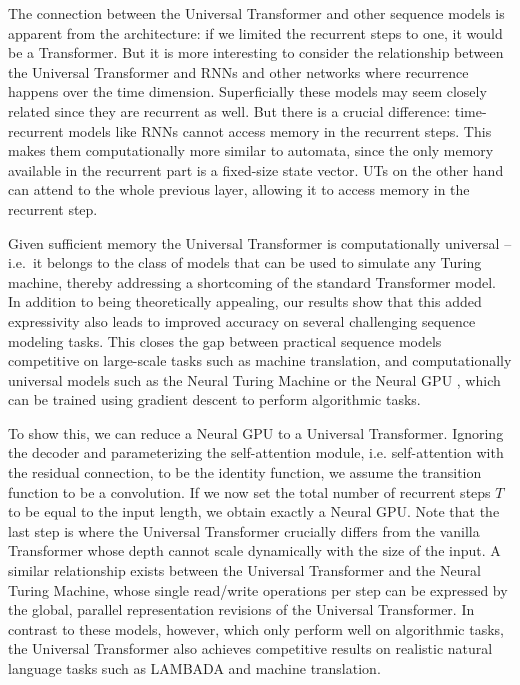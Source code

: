 The connection between the Universal Transformer and other sequence models is apparent from the architecture: if we limited the recurrent steps to one, it would be a Transformer. But it is more interesting to consider the relationship between the Universal Transformer and RNNs and other networks where recurrence happens over the time dimension. Superficially these models may seem closely related since they are recurrent as well. But there is a crucial difference: time-recurrent models like RNNs cannot access memory in the recurrent steps. This makes them computationally more similar to automata, since the only memory available in the recurrent part is a fixed-size state vector. UTs on the other hand can attend to the whole previous layer, allowing it to access memory in the recurrent step. 

Given sufficient memory the Universal Transformer is computationally universal -- i.e.\ it belongs to the class of models that can be used to simulate any Turing machine, thereby addressing a shortcoming of the standard Transformer model. In addition to being theoretically appealing, our results show that this added expressivity also leads to improved accuracy on several challenging sequence modeling tasks. This closes the gap between practical sequence models competitive on large-scale tasks such as machine translation, and computationally universal models such as the Neural Turing Machine or the Neural GPU \citep{ntm14,neural_gpu}, which can be trained using gradient descent to perform algorithmic tasks.

To show this, we can reduce a Neural GPU to a Universal Transformer. Ignoring the decoder and parameterizing the self-attention module, i.e. self-attention with the residual connection, to be the identity function, we assume the transition function to be a convolution. If we now set the total number of recurrent steps $T$ to be equal to the input length, we obtain exactly a Neural GPU. Note that the last step is where the Universal Transformer crucially differs from the vanilla Transformer whose depth cannot scale dynamically with the size of the input. A similar relationship exists between the Universal Transformer and the Neural Turing Machine, whose single read/write operations per step can be expressed by the global, parallel representation revisions of the Universal Transformer. In contrast to these models, however, which only perform well on algorithmic tasks, the Universal Transformer also achieves competitive results on realistic natural language tasks such as LAMBADA and machine translation.

